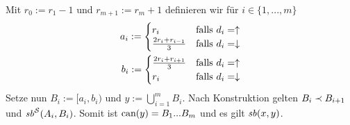 \begin{bew}
%     
    Mit $r_0 := r_1-1$ und $r_{m+1} := r_m+1$ definieren wir für $i \in \{1, ..., m\}$
    \begin{align*}
        a_i := 
            \begin{cases}
                r_i & \text{falls $d_i = \uparrow$}\\
                \frac{2r_i + r_{i-1}}{3} & \text{falls $d_i = \downarrow$}
            \end{cases}\\
        b_i := 
            \begin{cases}
                \frac{2r_i + r_{i+1}}{3} & \text{falls $d_i = \uparrow$}\\
                r_i & \text{falls $d_i = \downarrow$}
            \end{cases}
    \end{align*}
    Setze nun $B_i := [a_i, b_i)$ und $y := \bigcup_{i=1}^m B_i$.
    Nach Konstruktion gelten $B_i \prec B_{i+1}$ und $\mathit{sb}^{\mathcal{S}}(A_i, B_i)$.
    Somit ist $\text{can}(y) = B_1 ... B_m$ und es gilt $\mathit{sb}(x,y)$.
\end{bew}









